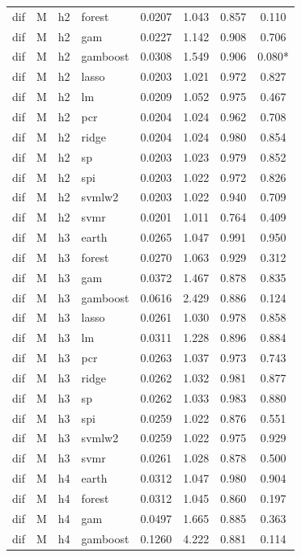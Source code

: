 \begin{ThreePartTable}
\begin{longtable}[t]{llclcccc}
dif & M & h2 & forest & 0.0207 & 1.043 & 0.857 & 0.110\\
dif & M & h2 & gam & 0.0227 & 1.142 & 0.908 & 0.706\\
dif & M & h2 & gamboost & 0.0308 & 1.549 & 0.906 & 0.080*\\
dif & M & h2 & lasso & 0.0203 & 1.021 & 0.972 & 0.827\\
dif & M & h2 & lm & 0.0209 & 1.052 & 0.975 & 0.467\\
dif & M & h2 & pcr & 0.0204 & 1.024 & 0.962 & 0.708\\
dif & M & h2 & ridge & 0.0204 & 1.024 & 0.980 & 0.854\\
dif & M & h2 & sp & 0.0203 & 1.023 & 0.979 & 0.852\\
dif & M & h2 & spi & 0.0203 & 1.022 & 0.972 & 0.826\\
dif & M & h2 & svmlw2 & 0.0203 & 1.022 & 0.940 & 0.709\\
dif & M & h2 & svmr & 0.0201 & 1.011 & 0.764 & 0.409\\
\addlinespace
dif & M & h3 & earth & 0.0265 & 1.047 & 0.991 & 0.950\\
dif & M & h3 & forest & 0.0270 & 1.063 & 0.929 & 0.312\\
dif & M & h3 & gam & 0.0372 & 1.467 & 0.878 & 0.835\\
dif & M & h3 & gamboost & 0.0616 & 2.429 & 0.886 & 0.124\\
dif & M & h3 & lasso & 0.0261 & 1.030 & 0.978 & 0.858\\
dif & M & h3 & lm & 0.0311 & 1.228 & 0.896 & 0.884\\
dif & M & h3 & pcr & 0.0263 & 1.037 & 0.973 & 0.743\\
dif & M & h3 & ridge & 0.0262 & 1.032 & 0.981 & 0.877\\
dif & M & h3 & sp & 0.0262 & 1.033 & 0.983 & 0.880\\
dif & M & h3 & spi & 0.0259 & 1.022 & 0.876 & 0.551\\
dif & M & h3 & svmlw2 & 0.0259 & 1.022 & 0.975 & 0.929\\
dif & M & h3 & svmr & 0.0261 & 1.028 & 0.878 & 0.500\\
\addlinespace
dif & M & h4 & earth & 0.0312 & 1.047 & 0.980 & 0.904\\
dif & M & h4 & forest & 0.0312 & 1.045 & 0.860 & 0.197\\
dif & M & h4 & gam & 0.0497 & 1.665 & 0.885 & 0.363\\
dif & M & h4 & gamboost & 0.1260 & 4.222 & 0.881 & 0.114\\

\end{longtable}
\end{ThreePartTable}
